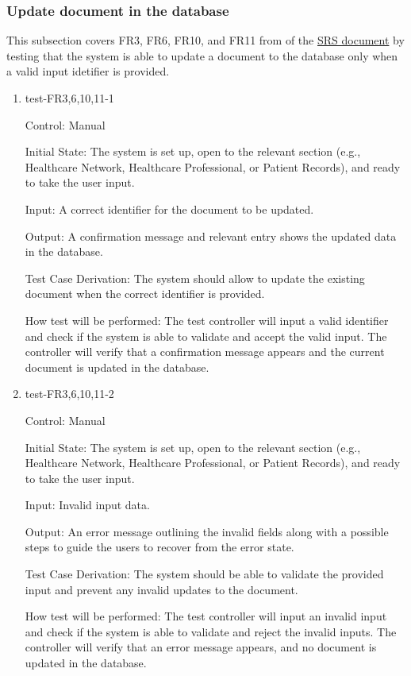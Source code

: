 \documentclass[12pt, titlepage]{article}
\begin{document}
\subsubsection{Update document in the database} \label{section:4.1.3}

This subsection covers FR3, FR6, FR10, and FR11 from of the \href{https://github.com/Inreet-Kaur/capstone/blob/main/docs/SRS/SRS.pdf}{SRS document} by testing that the system is able to update a document to the database only when a valid input idetifier is provided.

\begin{enumerate}

\item{test-FR3,6,10,11-1} \label{test-FR3,6,10,11-1}

Control: Manual

Initial State: The system is set up, open to the relevant section (e.g., Healthcare Network, Healthcare Professional, or Patient Records), and ready to take the user input.

Input: A correct identifier for the document to be updated.

Output: A confirmation message and relevant entry shows the updated data in the database.

Test Case Derivation: The system should allow to update the existing document when the correct identifier is provided.

How test will be performed: The test controller will input a valid identifier and check if the system is able to validate and accept the valid input. The controller will verify that a confirmation message appears and the current document is updated in the database.


\item{test-FR3,6,10,11-2} \label{test-FR3,6,10,11-2}

Control: Manual

Initial State: The system is set up, open to the relevant section (e.g., Healthcare Network, Healthcare Professional, or Patient Records), and ready to take the user input.

Input: Invalid input data.

Output: An error message outlining the invalid fields along with a possible steps to guide the users to recover from the error state.

Test Case Derivation: The system should be able to validate the provided input and prevent any invalid updates to the document.

How test will be performed: The test controller will input an invalid input and check if the system is able to validate and reject the invalid inputs. The controller will verify that an error message appears, and no document is updated in the database. 

\end{enumerate}
\end{document}
